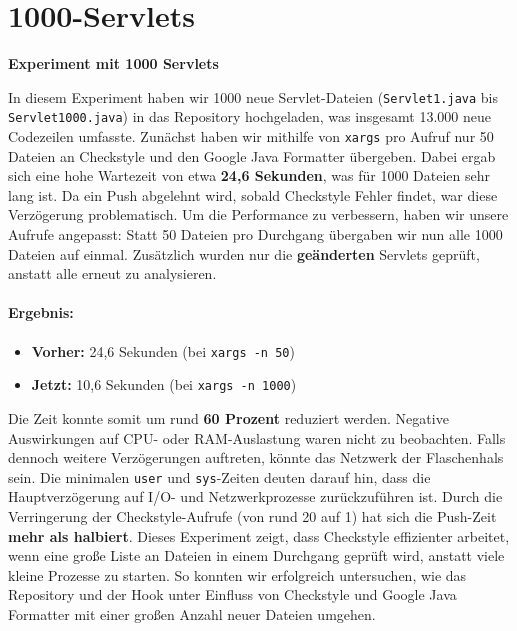 \section*{1000-Servlets}
\textbf{Experiment mit 1000 Servlets}

In diesem Experiment haben wir 1000 neue Servlet-Dateien 
(\texttt{Servlet1.java} bis \texttt{Servlet1000.java}) in das Repository 
hochgeladen, was insgesamt 13.000 neue Codezeilen umfasste.
Zunächst haben wir mithilfe von \texttt{xargs} pro Aufruf nur 50 Dateien an 
Checkstyle und den Google Java Formatter übergeben. Dabei ergab sich eine hohe 
Wartezeit von etwa \textbf{24,6 Sekunden}, was für 1000 Dateien sehr lang ist.  
Da ein Push abgelehnt wird, sobald Checkstyle Fehler findet, war diese Verzögerung problematisch.
Um die Performance zu verbessern, haben wir unsere Aufrufe angepasst:  
Statt 50 Dateien pro Durchgang übergaben wir nun alle 1000 Dateien auf einmal.  
Zusätzlich wurden nur die \textbf{geänderten} Servlets geprüft, anstatt alle erneut zu analysieren.
\paragraph{Ergebnis:}
\begin{itemize}
    \item \textbf{Vorher:} 24,6 Sekunden (bei \texttt{xargs -n 50})
    \item \textbf{Jetzt:} 10,6 Sekunden (bei \texttt{xargs -n 1000})
\end{itemize}

Die Zeit konnte somit um rund \textbf{60 Prozent} reduziert werden.  
Negative Auswirkungen auf CPU- oder RAM-Auslastung waren nicht zu beobachten.  
Falls dennoch weitere Verzögerungen auftreten, könnte das Netzwerk der Flaschenhals sein.  
Die minimalen \texttt{user} und \texttt{sys}-Zeiten deuten darauf hin, dass die Hauptverzögerung 
auf I/O- und Netzwerkprozesse zurückzuführen ist.
Durch die Verringerung der Checkstyle-Aufrufe (von rund 20 auf 1) hat sich die Push-Zeit 
\textbf{mehr als halbiert}.  
Dieses Experiment zeigt, dass Checkstyle effizienter arbeitet,  
wenn eine große Liste an Dateien in einem Durchgang geprüft wird,  
anstatt viele kleine Prozesse zu starten.  
So konnten wir erfolgreich untersuchen, wie das Repository und der Hook unter Einfluss 
von Checkstyle und Google Java Formatter mit einer großen Anzahl neuer Dateien umgehen.

